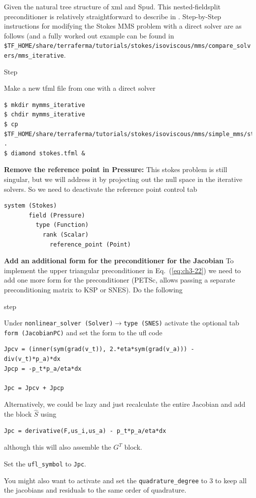 Given the natural tree structure of xml and Spud.  This
nested-fieldsplit preconditioner is relatively straightforward to
describe in \TF{}.  Step-by-Step instructions for modifying the Stokes
MMS problem with a direct solver are as follows (and a fully worked
out example can be found in
\texttt{\$TF\_HOME/share/terraferma/tutorials/stokes/isoviscous/mms/compare\_solvers/mms\_iterative}.
\begin{steps}{Step}
\item Make a new tfml file from one with a direct solver
  \begin{lstlisting}[style=Bash]
$ mkdir mymms_iterative
$ chdir mymms_iterative
$ cp $TF_HOME/share/terraferma/tutorials/stokes/isoviscous/mms/simple_mms/stokes.tfml .
$ diamond stokes.tfml &
  \end{lstlisting}%
\item \textbf{Remove the reference point in Pressure:} This stokes
  problem is still singular, but we will address it by projecting out
  the null space in the iterative solvers.  So we need to deactivate the
  reference point control tab
  \begin{lstlisting}[style=Python]
    system (Stokes)
       field (Pressure)
         type (Function)
           rank (Scalar)
             reference_point (Point)
  \end{lstlisting}
\item \textbf{Add an additional form for the preconditioner for the
    Jacobian} To implement the upper triangular preconditioner in Eq.\
  (\ref{eq:ch3-22}) we need to add one more form for the preconditioner
  (PETSc, allows passing a separate preconditioning matrix to KSP or
  SNES). Do the following
  \begin{steps}{step}
  \item Under \texttt{nonlinear\_solver
    (Solver)}$\rightarrow$\texttt{type (SNES)} activate the optional
  tab \texttt{form (JacobianPC)} and set the form to the ufl code
  \begin{lstlisting}[style=UFL]
Jpcv = (inner(sym(grad(v_t)), 2.*eta*sym(grad(v_a))) - div(v_t)*p_a)*dx
Jpcp = -p_t*p_a/eta*dx

Jpc = Jpcv + Jpcp
  \end{lstlisting}
Alternatively,  we could be lazy and just recalculate the entire
Jacobian and add the  block $\hat{S}$ using
\begin{lstlisting}[style=UFL]
Jpc = derivative(F,us_i,us_a) - p_t*p_a/eta*dx
\end{lstlisting}
although this will also assemble the $G^{T}$ block.
\item Set the \texttt{ufl\_symbol} to
  \texttt{Jpc}.
\item You might also want to activate and set the
  \texttt{quadrature\_degree} to 3 to keep all the jacobians and
  residuals to the same order of quadrature.
  \end{steps}


\end{steps}
